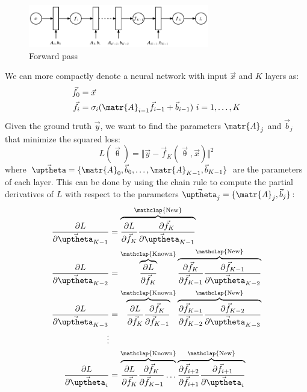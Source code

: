 \begin{figure}[ht]
    \centering
    \includegraphics[width=0.7\textwidth]{img/_forward_pass.pdf}
    \caption{Forward pass}
\end{figure}

We can more compactly denote a neural network with input $\vec{x}$ and $K$ layers as:
\[ 
    \begin{split}
        \vec{f}_0 &= \vec{x} \\
        \vec{f}_i &= \sigma_i(\matr{A}_{i-1} \vec{f}_{i-1} + \vec{b}_{i-1}) \text{ } i=1, \dots, K
    \end{split}
\]
Given the ground truth $\vec{y}$, we want to find the parameters $\matr{A}_j$ and $\vec{b}_j$ that minimize the squared loss:
\[ L(\vec{\uptheta}) = \Vert \vec{y} - \vec{f}_K(\vec{\uptheta}, \vec{x}) \Vert^2 \]
where $\vec{\uptheta} = \{ \matr{A}_{0}, \vec{b}_{0}, \dots, \matr{A}_{K-1}, \vec{b}_{K-1} \}$ are the parameters of each layer.
This can be done by using the chain rule to compute the partial derivatives of $L$ with respect to the parameters $\vec{\uptheta}_j = \{ \matr{A}_j, \vec{b}_j \}$:
\[
    \begin{split}
        \frac{\partial L}{\partial \vec{\uptheta}_{K-1}} &= 
            \overbrace{\frac{\partial L}{\partial \vec{f}_K} \frac{\partial \vec{f}_K}{\partial \vec{\uptheta}_{K-1}}}^{\mathclap{\text{New}}} \\
        \frac{\partial L}{\partial \vec{\uptheta}_{K-2}} &= 
            \overbrace{\frac{\partial L}{\partial \vec{f}_K}}^{\mathclap{\text{Known}}}
            \overbrace{\frac{\partial \vec{f}_K}{\partial \vec{f}_{K-1}} \frac{\partial \vec{f}_{K-1}}{\partial \vec{\uptheta}_{K-2}}}^{\mathclap{\text{New}}} \\
        \frac{\partial L}{\partial \vec{\uptheta}_{K-3}} &= 
            \overbrace{\frac{\partial L}{\partial \vec{f}_K} \frac{\partial \vec{f}_K}{\partial \vec{f}_{K-1}}}^{\mathclap{\text{Known}}}
            \overbrace{\frac{\partial \vec{f}_{K-1}}{\partial \vec{f}_{K-2}} \frac{\partial \vec{f}_{K-2}}{\partial \vec{\uptheta}_{K-3}}}^{\mathclap{\text{New}}} \\
        \vdots \\
        \frac{\partial L}{\partial \vec{\uptheta}_{i}} &= 
            \overbrace{\frac{\partial L}{\partial \vec{f}_K} \frac{\partial \vec{f}_K}{\partial \vec{f}_{K-1}} \dots}^{\mathclap{\text{Known}}}
            \overbrace{\frac{\partial \vec{f}_{i+2}}{\partial \vec{f}_{i+1}} \frac{\partial \vec{f}_{i+1}}{\partial \vec{\uptheta}_{i}}}^{\mathclap{\text{New}}}
    \end{split}
\]

